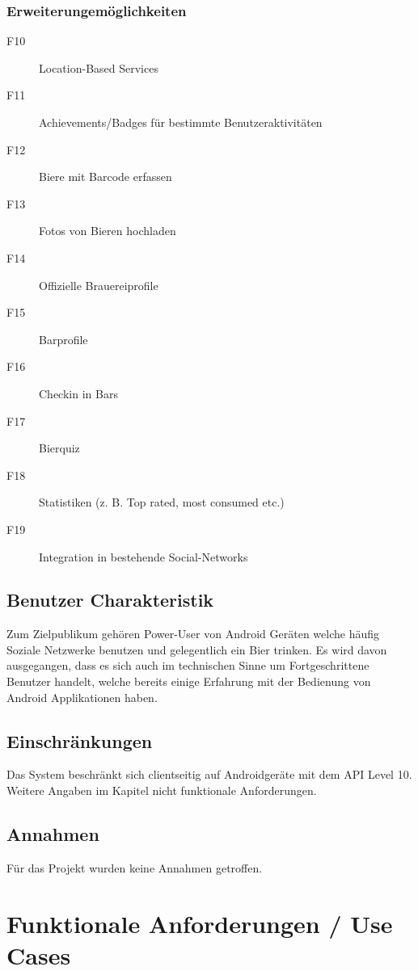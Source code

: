 \documentclass[10pt,a4paper]{scrartcl}
\begin{document}
\subsubsection{Erweiterungemöglichkeiten}
\begin{description}
\item[F10] Location-Based Services
\item[F11] Achievements/Badges für bestimmte Benutzeraktivitäten
\item[F12] Biere mit Barcode erfassen
\item[F13] Fotos von Bieren hochladen
\item[F14] Offizielle Brauereiprofile
\item[F15] Barprofile
\item[F16] Checkin in Bars
\item[F17] Bierquiz
\item[F18] Statistiken (z. B. Top rated, most consumed etc.)
\item[F19] Integration in bestehende Social-Networks
\end{description}

\subsection{Benutzer Charakteristik}
Zum Zielpublikum gehören Power-User von Android Geräten welche häufig Soziale Netzwerke benutzen und gelegentlich ein Bier trinken. Es wird davon ausgegangen, dass es sich auch im technischen Sinne um Fortgeschrittene Benutzer handelt, welche bereits einige Erfahrung mit der Bedienung von Android Applikationen haben.

\subsection{Einschränkungen}
Das System beschränkt sich clientseitig auf Androidgeräte mit dem API Level 10. Weitere Angaben im Kapitel nicht funktionale Anforderungen.

\subsection{Annahmen}
Für das Projekt wurden keine Annahmen getroffen.


\section{Funktionale Anforderungen / Use Cases}
\end{document}
